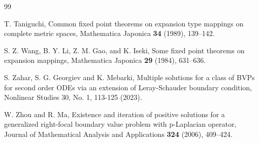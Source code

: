 \documentclass[reqno, 12pt]{amsart}
\numberwithin{equation}{section}
\begin{document}
\begin{thebibliography}{99}


 T. Taniguchi, Common fixed point theorems on expansion type mappings on complete metric spaces, Mathematica Japonica \textbf{34} (1989), 139--142.


 S. Z. Wang, B. Y. Li, Z. M. Gao, and K. Iseki, Some fixed point theorems on expansion mappings, Mathematica Japonica \textbf{29} (1984), 631--636.


 S. Zahar, S. G. Georgiev and K. Mebarki, Multiple solutions for a class of BVPs for second order ODEs via an extension of Leray-Schauder boundary condition, Nonlinear Studies 30, No. 1, 113-125 (2023).

 W. Zhou and R. Ma, Existence and iteration of positive solutions for a generalized right-focal boundary value problem with p-Laplacian operator, Journal of Mathematical Analysis and Applications \textbf{324} (2006), 409--424.

\end{thebibliography}
\end{document}
